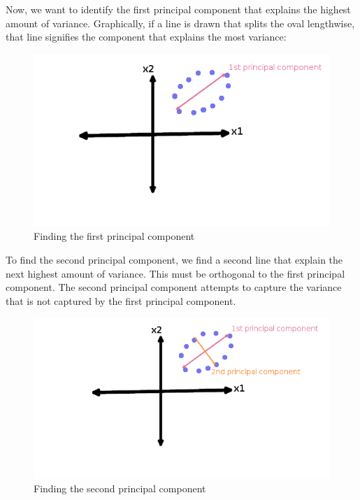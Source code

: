 \documentclass[12pt,twoside]{reedthesis}
\begin{document}
  Now, we want to identify the first principal component that explains the
  highest amount of variance. Graphically, if a line is drawn that splits
  the oval lengthwise, that line signifies the component that explains the
  most variance:
  
  \begin{figure}[htbp]
  \centering
  \includegraphics{figure/PrincipalComponent1.png}
  \caption{Finding the first principal component}
  \end{figure}
  
  \newpage
  
  To find the second principal component, we find a second line that
  explain the next highest amount of variance. This must be orthogonal to
  the first principal component. The second principal component attempts
  to capture the variance that is not captured by the first principal
  component.
  
  \begin{figure}[htbp]
  \centering
  \includegraphics{figure/PrincipalComponent2.png}
  \caption{Finding the second principal component}
  \end{figure}
  
\end{document}
